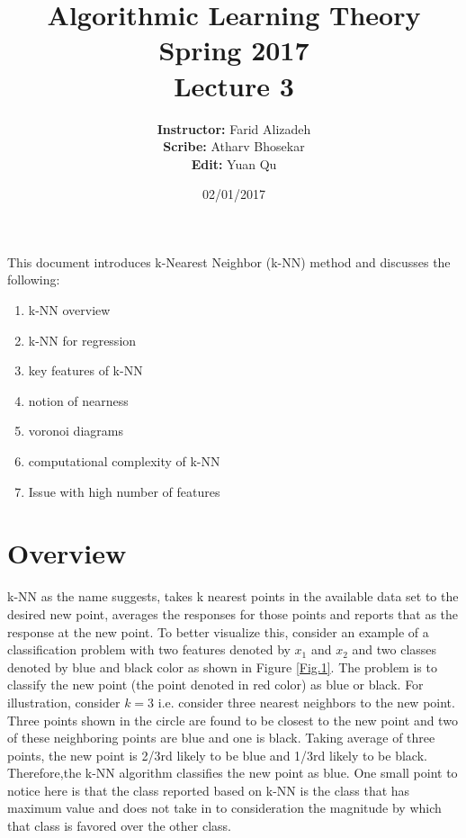 \documentclass{article}
\title{ 
Algorithmic Learning Theory\\
Spring 2017\\
Lecture 3
}
\author{
{\bf Instructor:} Farid Alizadeh\\
{\bf Scribe:} Atharv Bhosekar\\
{\bf Edit:} Yuan Qu\\
}
\date{02/01/2017}
\begin{document}
\pagestyle{fancy}

\maketitle
%
\oddsidemargin 0.0in 
\textwidth 6.25in 
\topmargin -0.25in 
\textheight 8.25in    


\medskip

This document introduces k-Nearest Neighbor (k-NN) method and discusses the following:  
\begin{enumerate}
\item k-NN overview 
\item k-NN for regression
\item key features of k-NN
\item notion of nearness
\item voronoi diagrams
\item computational complexity of k-NN
\item Issue with high number of features
\end{enumerate}

\section{Overview} %
k-NN as the name suggests, takes k nearest points in the available data set to the desired new point, averages the responses for those points and reports that as the response at the new point. To better visualize this, consider an example of a classification problem with two features denoted by $x_1$ and $x_2$ and two classes denoted by blue and black color as shown in Figure \ref{Fig.1}. The problem is to classify the new point (the point denoted in red color) as blue or black. For illustration, consider $k = 3$ i.e. consider three nearest neighbors to the new point. Three points shown in the circle are found to be closest to the new point and two of these neighboring points are blue and one is black. Taking average of three points, the new point is 2/3rd likely to be blue and 1/3rd likely to be black. Therefore,the k-NN algorithm classifies the new point as blue. One small point to notice here is that the class reported based on k-NN is the class that has maximum value and does not take in to consideration the magnitude by which that class is favored over the other class.
\end{document}
